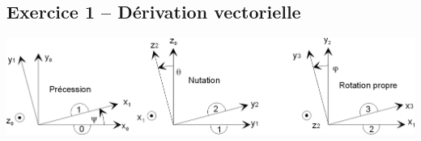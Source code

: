 \documentclass[10pt,oneside]{article}
\begin{document}
\subsection*{Exercice 1 -- Dérivation vectorielle}
\begin{center}
\includegraphics[width=.95\textwidth]{png/fig1}
\end{center}

\subparagraph{}
\textit{}
\end{document}
